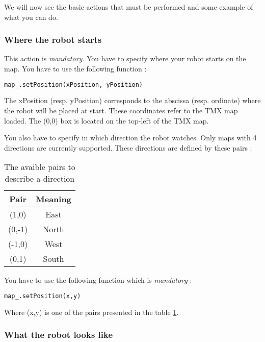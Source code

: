 \documentclass[a4paper,11pt]{article}
\begin{document}
We will now see the basic actions that must be performed and some
example of what you can do.

\subsubsection{Where the robot starts}

This action is \emph{mandatory}. You have to specify where your robot
starts on the map. You have to use the following function :

\begin{lstlisting}[language=Python]
map_.setPosition(xPosition, yPosition)
\end{lstlisting}

The xPosition (resp. yPosition) corresponds to the abscissa
(resp. ordinate) where the robot will be placed at start. These
coordinates refer to the TMX map loaded. The (0,0) box is located on
the top-left of the TMX map.

You also have to specify in which direction the robot watches. Only
maps with 4 directions are currently supported. These directions are
defined by these pairs :


\begin{table}[h]
\begin{center}
\begin{tabular}{|c|c|}
  \hline
  Pair & Meaning \\
  \hline
  (1,0) & East \\
  (0,-1) & North \\
  (-1,0) & West \\
  (0,1) & South \\
  \hline
\end{tabular} 
\caption{\label{tab:Pypairs} The avaible pairs to describe a
  direction}
\end{center}
\end{table}


You have to use the following function which is \emph{mandatory} :

\begin{lstlisting}[language=Python]
map_.setPosition(x,y)
\end{lstlisting}

Where (x,y) is one of the pairs presented in the table \ref{tab:Pypairs}.

\subsubsection{What the robot looks like}
\end{document}
